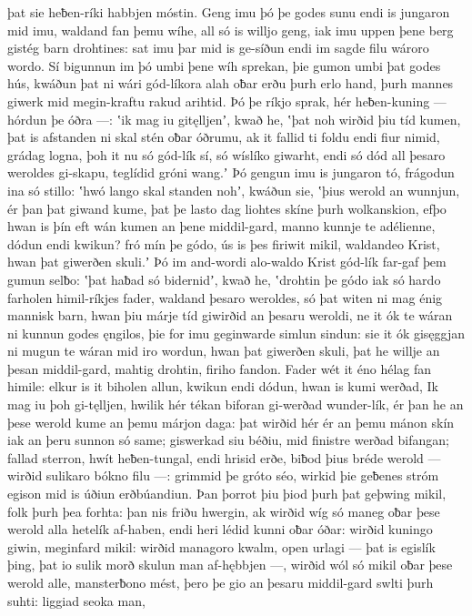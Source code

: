 þat sie heƀen-ríki habbjen móstin.
Geng imu þó þe godes sunu endi is jungaron mid imu,
waldand fan þemu wíhe, all só is willjo geng,
iak imu uppen þene berg gistég barn drohtines:
sat imu þar mid is ge-síðun endi im sagde filu
wároro wordo. Sí bigunnun im þó umbi þene wíh sprekan,
þie gumon umbi þat godes hús, kwáðun þat ni wári gód-líkora
alah oƀar erðu þurh erlo hand,
þurh mannes giwerk mid megin-kraftu
rakud arihtid. Þó þe ríkjo sprak,
hér heƀen-kuning — hórdun þe óðra —:
ʽik mag iu gitęlljenʼ, kwað he, ʽþat noh wirðid þiu tíd kumen,
þat is afstanden ni skal stén oƀar óðrumu,
ak it fallid ti foldu endi fiur nimid,
grádag logna, þoh it nu só gód-lík sí,
só wíslíko giwarht, endi só dód all þesaro weroldes gi-skapu,
teglídid gróni wang.ʼ Þó gengun imu is jungaron tó,
frágodun ina só stillo: ʽhwó lango skal standen nohʼ, kwáðun sie,
ʽþius werold an wunnjun, ér þan þat giwand kume,
þat þe lasto dag liohtes skíne
þurh wolkanskion, efþo hwan is þín eft wán kumen
an þene middil-gard, manno kunnje
te adélienne, dódun endi kwikun?
fró mín þe gódo, ús is þes firiwit mikil,
waldandeo Krist, hwan þat giwerðen skuli.ʼ
Þó im and-wordi alo-waldo Krist
gód-lík far-gaf þem gumun selƀo:
ʽþat haƀad só bidernidʼ, kwað he, ʽdrohtin þe gódo
iak só hardo farholen himil-ríkjes fader,
waldand þesaro weroldes, só þat witen ni mag
énig mannisk barn, hwan þiu márje tíd
giwirðid an þesaru weroldi, ne it ók te wáran ni kunnun
godes ęngilos, þie for imu geginwarde
simlun sindun: sie it ók gisęggjan ni mugun
te wáran mid iro wordun, hwan þat giwerðen skuli,
þat he willje an þesan middil-gard, mahtig drohtin,
firiho fandon. Fader wét it éno
hélag fan himile: elkur is it biholen allun,
kwikun endi dódun, hwan is kumi werðad,
Ik mag iu þoh gi-tęlljen, hwilik hér tékan biforan
gi-werðad wunder-lík, ér þan he an þese werold kume
an þemu márjon daga: þat wirðid hér ér an þemu mánon skín
iak an þeru sunnon só same; giswerkad siu béðiu,
mid finistre werðad bifangan; fallad sterron,
hwít heƀen-tungal, endi hrisid erðe,
biƀod þius bréde werold — wirðid sulikaro bókno filu —:
grimmid þe gróto séo, wirkid þie geƀenes stróm
egison mid is úðiun erðbúandiun.
Þan þorrot þiu þiod þurh þat geþwing mikil,
folk þurh þea forhta: þan nis friðu hwergin,
ak wirðid wíg só maneg oƀar þese werold alla
hetelík af-haben, endi heri lédid
kunni oƀar óðar: wirðid kuningo giwin,
meginfard mikil: wirðid managoro kwalm,
open urlagi — þat is egislík þing,
þat io sulik morð skulun man af-hębbjen —,
wirðid wól só mikil oƀar þese werold alle,
mansterƀono mést, þero þe gio an þesaru middil-gard
swlti þurh suhti: liggiad seoka man,

